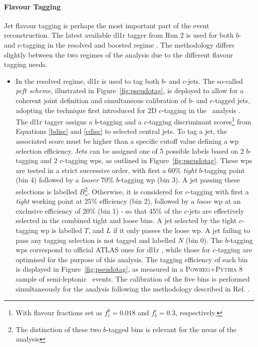 \paragraph{Flavour Tagging} Jet flavour tagging is perhaps the most important part of the event reconstruction. The latest available \gls{dl1r} tagger from Run 2 is used for both $b$- and $c$-tagging in the resolved and boosted regime \cite{atlas:FTAGRUN2}. The methodology differs slightly between the two regimes of the analysis due to the different flavour tagging needs.
\begin{itemize}[leftmargin=*]
\item In the resolved regime, \gls{dl1r} is used to tag both $b$- and $c$-jets. The so-called \textit{ \gls{pcft} scheme}, illustrated in Figure~\ref{fig:pseudotag}, is deployed to allow for a coherent joint definition and simultaneous calibration of $b$- and $c$-tagged jets, adopting the technique first introduced for 2D $c$-tagging in the \vhc\ analysis \cite{Collaboration:2721696}. The \gls{dl1r} tagger assigns a $b$-tagging and a $c$-tagging discriminant scores\footnote{With flavour fractions set as $f^b_c = 0.018$ and $f^c_b = 0.3$, respectively.} from Equations \ref{bdisc} and \ref{cdisc} to selected central jets. To tag a jet, the associated score must be higher than a specific cutoff value defining a \gls{wp} selection efficiency. Jets can be assigned one of 5 possible labels based on 2 $b$-tagging and 2 $c$-tagging \glspl{wp}, as outlined in Figure~\ref{fig:pseudotag}. These \glspl{wp} are tested in a strict successive order, with first a 60\% \textit{tight} $b$-tagging point (bin 4) followed by a \textit{looser} 70\% $b$-tagging \gls{wp} (bin 3). A jet passing these selections is labelled $B$\footnote{The distinction of these two $b$-tagged bins is relevant for the \glspl{mva} of the analysis}. Otherwise, it is considered for $c$-tagging with first a \textit{tight} working point at 25\% efficiency (bin 2), followed by a \textit{loose} \gls{wp} at an exclusive efficiency of 20\% (bin 1) - so that 45\% of the $c$-jets are effectively selected in the combined tight and loose bins. A jet selected by the tight $c$-tagging \gls{wp} is labelled $T$, and $L$ if it only passes the loose \gls{wp}. A jet failing to pass any tagging selection is not tagged and labelled $N$ (bin 0). The $b$-tagging \glspl{wp} correspond to official ATLAS ones for \gls{dl1r} \cite{atlas:FTAGRUN2}, while those for $c$-tagging are optimised for the purpose of this analysis. The tagging efficiency of each bin is displayed in Figure~\ref{fig:pseudotag}, as measured in a \textsc{Powheg}+\textsc{Pythia} 8 sample of semi-leptonic \ttb\ events. The calibration of the five bins is performed simultaneously for the analysis following the methodology described in Ref. \cite{atlas:FTAGRUN2}.%


\end{itemize}
